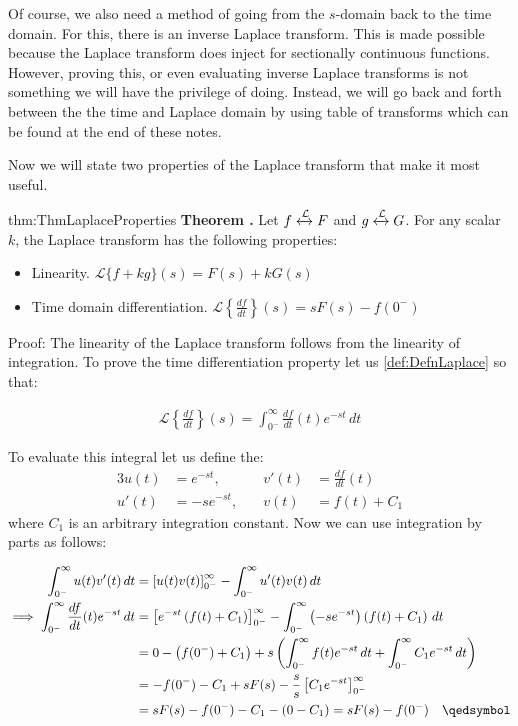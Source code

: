 \documentclass[14pt,a5paper,twoside]{book}
\newenvironment{myTheorem}[2]{ \begin{Theorem}[adjusted title=#1]{}{#2} 
  \textbf{Theorem \thetcbcounter.} \label{#2}}{\end{Theorem}}
\begin{document}
Of course, we also need a method of going from the $s$-domain back to the time domain. For this, there is an inverse Laplace transform. This is made possible because the Laplace transform does inject for sectionally continuous functions. However, proving this, or even evaluating inverse Laplace transforms is not something we will have the privilege of doing. Instead, we will go back and forth between the the time and Laplace domain by using table of transforms which can be found at the end of these notes.

Now we will state two properties of the Laplace transform that make it most useful.
\begin{myTheorem}{Laplace Transform Properties}{thm:ThmLaplaceProperties}
	Let $f \xleftrightarrow{\mathcal{L}} F$ and $g \xleftrightarrow{\mathcal{L}} G$. For any scalar $k$, the Laplace transform has the following properties:
	
	\begin{itemize}
		\item Linearity. $\mathcal{L}\{f + kg\}(s) = F(s) + k G(s)$
		\item Time domain differentiation. $\mathcal{L}\left\{\frac{df}{dt}\right\}(s) = s F(s) - f(0^-)$
	\end{itemize}
\end{myTheorem}
Proof: The linearity of the Laplace transform follows from the linearity of integration. To prove the time differentiation property let us \ref{def:DefnLaplace} so that:

\begin{align*}
\mathcal{L}\left\{\frac{df}{dt}\right\}(s) = \int_{0^-}^{\infty} \frac{df}{dt}(t) e^{-st}\, dt
\end{align*}

To evaluate this integral let us define the:
\begin{alignat*}{3}
u(t) &= e^{-st},\quad &v'(t) &= \frac{df}{dt}(t) \\
u'(t) &= -se^{-st},\quad &v(t) &= f(t) + C_1
\end{alignat*}
where $C_1$ is an arbitrary integration constant. Now we can use integration by parts as follows:

\begin{align*}
\int_{0^-}^{\infty} u(t) v'(t) \,dt &= \left[ u(t) v(t) \right]_{0^-}^\infty - \int_{0^-}^{\infty} u'(t) v(t) \,dt \\
\implies \int_{0^-}^{\infty} \frac{df}{dt}(t) e^{-st}\, dt &= \left[ e^{-st}\left(f(t)+C_1\right)\right]_{0^-}^\infty - \int_{0^-}^{\infty} \left(-se^{-st}\right)\left(f(t)+C_1\right)\,dt \\
&= 0 - \left(f(0^-)+C_1\right) + s \left(\int_{0^-}^{\infty} f(t) e^{-st}\,dt + \int_{0^-}^\infty C_1 e^{-st}\,dt \right) \\
&= -f(0^-) -C_1 + s F(s) - \frac{s}{s} \left[C_1 e^{-st}\right]_{0^-}^\infty \\
&= sF(s) -f(0^-) - C_1 - (0 - C_1) = sF(s) - f(0^-)\quad\qedsymbol
\end{align*}
\end{document}
